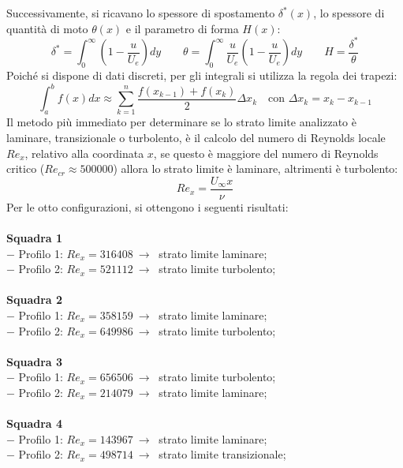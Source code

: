 \noindent Successivamente, si ricavano lo spessore di spostamento $\delta^*(x)$, lo spessore di quantità di moto $\theta(x)$ e il parametro di forma $H(x)$:
\begin{equation*}
    \delta^* = \int_0^\infty \left(1-\frac{u}{U_e}\right)dy \qquad \theta = \int_0^\infty \frac{u}{U_e}\left(1-\frac{u}{U_e}\right)dy \qquad H = \frac{\delta^*}{\theta}
\end{equation*}
Poiché si dispone di dati discreti, per gli integrali si utilizza la regola dei trapezi:
\begin{equation*}
    \int_a^b f(x)dx \approx \sum_{k=1}^n \frac{f(x_{k-1}) + f(x_k)}2 \Delta x_k \quad \text{con } \Delta x_k = x_k - x_{k-1}
\end{equation*}
Il metodo più immediato per determinare se lo strato limite analizzato è laminare, transizionale o turbolento, è il calcolo del numero di Reynolds locale $Re_x$, relativo alla coordinata $x$, se questo è maggiore del numero di Reynolds critico ($Re_{cr}\approx500000$) allora lo strato limite è laminare, altrimenti è turbolento:
\begin{equation*}
    Re_x = \frac{U_\infty x}\nu
\end{equation*}
Per le otto configurazioni, si ottengono i seguenti risultati:\\\\
\textbf{Squadra 1}\\
$-$ Profilo 1: $Re_x=316408\ \rightarrow\ $ strato limite laminare;\\
$-$ Profilo 2: $Re_x=521112\ \rightarrow\ $ strato limite turbolento;\\\\
\textbf{Squadra 2}\\
$-$ Profilo 1: $Re_x=358159\ \rightarrow\ $ strato limite laminare;\\
$-$ Profilo 2: $Re_x=649986\ \rightarrow\ $ strato limite turbolento;\\\\
\textbf{Squadra 3}\\
$-$ Profilo 1: $Re_x=656506\ \rightarrow\ $ strato limite turbolento;\\
$-$ Profilo 2: $Re_x=214079\ \rightarrow\ $ strato limite laminare;\\\\
\textbf{Squadra 4}\\
$-$ Profilo 1: $Re_x=143967\ \rightarrow\ $ strato limite laminare;\\
$-$ Profilo 2: $Re_x=498714\ \rightarrow\ $ strato limite transizionale;\\\\
